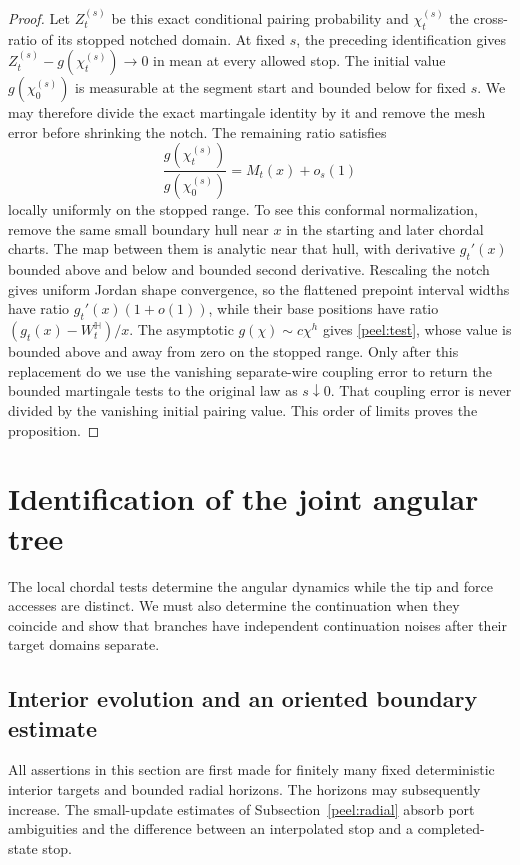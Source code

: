\begin{proof}
Let $Z_t^{(s)}$ be this exact conditional pairing probability and
$\chi_t^{(s)}$ the cross-ratio of its stopped notched domain.
At fixed $s$, the preceding identification gives
$Z_t^{(s)}-g(\chi_t^{(s)})\to0$ in mean at every allowed stop.
The initial value $g(\chi_0^{(s)})$ is measurable at the segment start
and bounded below for fixed $s$.  We may therefore divide the exact
martingale identity by it and remove the mesh error before shrinking
the notch.  The remaining ratio satisfies
\[
 \frac{g(\chi_t^{(s)})}{g(\chi_0^{(s)})}
 =M_t(x)+o_s(1)
\]
locally uniformly on the stopped range.  To see this conformal
normalization, remove the same small boundary hull near $x$ in the
starting and later chordal charts.  The map between them is analytic
near that hull, with derivative $g_t'(x)$ bounded above and below and
bounded second derivative.  Rescaling the notch gives uniform Jordan
shape convergence, so the flattened prepoint interval widths have
ratio $g_t'(x)(1+o(1))$, while their base positions have ratio
$(g_t(x)-W_t^{\mathbb H})/x$.  The asymptotic
$g(\chi)\sim c\chi^h$ gives \eqref{peel:test}, whose value is bounded
above and away from zero on the stopped range.  Only after this
replacement do we use the vanishing separate-wire coupling error to
return the bounded martingale tests to the original law as
$s\downarrow0$.  That coupling error is never divided by the vanishing
initial pairing value.  This order of limits proves the proposition.
\end{proof}

\section{Identification of the joint angular tree}
\label{sec:tree}

The local chordal tests determine the angular dynamics while the tip
and force accesses are distinct.  We must also determine the
continuation when they coincide and show that branches have independent
continuation noises after their target domains separate.

\subsection{Interior evolution and an oriented boundary estimate}
\label{tree:tightness}

All assertions in this section are first made for finitely many
fixed deterministic interior targets and bounded radial horizons.
The horizons may subsequently increase.  The small-update estimates
of Subsection~\ref{peel:radial} absorb port ambiguities and the difference
between an interpolated stop and a completed-state stop.

